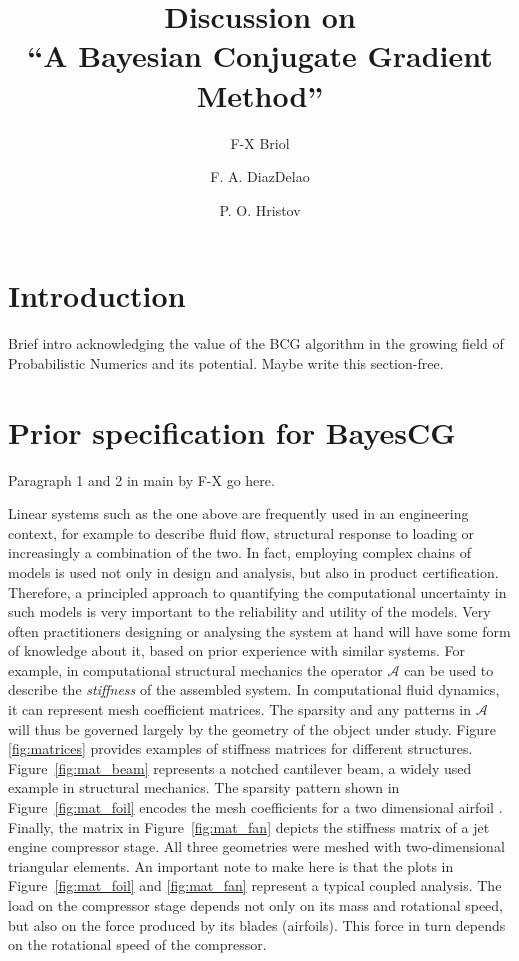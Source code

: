 \documentclass{elsarticle}
\begin{document}
	\begin{frontmatter}
		\title{\textbf{Discussion on \\
		 ``A Bayesian Conjugate Gradient Method''}}
		
		\author{F-X Briol}
		
		\author{F. A. DiazDelao}
		
		\author{P. O. Hristov}
		
		\address{University College London \& The Alan Turing Institute}
		\address{Institute for Risk and Uncertainty, University of Liverpool}
		
		\journal{}
	\end{frontmatter}
	\section{Introduction}
		Brief intro acknowledging the value of the BCG algorithm in the growing field of Probabilistic Numerics and its potential. Maybe write this section-free.
	\section{Prior specification for BayesCG}
		Paragraph 1 and 2 in main by F-X go here.
		
		Linear systems such as the one above are frequently used in an engineering context, for example to describe fluid flow, structural response to loading or increasingly a combination of the two. In fact, employing complex chains of models is used not only in design and analysis, but also in product certification. Therefore, a principled approach to quantifying the computational uncertainty in such models is very important to the reliability and utility of the models.
		Very often practitioners designing or analysing the system at hand will have some form of knowledge about it, based on prior experience with similar systems. For example, in computational structural mechanics the operator $\mathcal{A}$ can be used to describe the \textit{stiffness} of the assembled system. In computational fluid dynamics, it can represent mesh coefficient matrices. The sparsity and any patterns in $\mathcal{A}$ will thus be governed largely by the geometry of the object under study. Figure \ref{fig:matrices} provides examples of stiffness matrices for different structures. Figure~\ref{fig:mat_beam} represents a notched cantilever beam, a widely used example in structural mechanics. The sparsity pattern shown in Figure~\ref{fig:mat_foil} encodes the mesh coefficients for a two dimensional airfoil \cite{Davis:2011}. Finally, the matrix in Figure~\ref{fig:mat_fan} depicts the stiffness matrix of a jet engine compressor stage. All three geometries were meshed with two-dimensional triangular elements. An important note to make here is that the plots in Figure~\ref{fig:mat_foil} and \ref{fig:mat_fan} represent a typical coupled analysis. The load on the compressor stage depends not only on its mass and rotational speed, but also on the force produced by its blades (airfoils). This force in turn depends on the rotational speed of the compressor.
		
\end{document}
